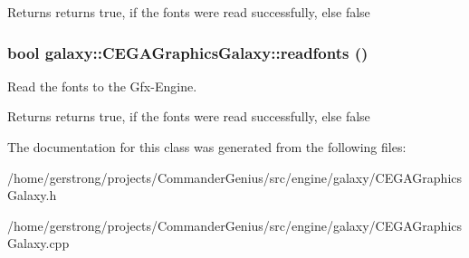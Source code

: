 \begin{DoxyReturn}{Returns}
returns true, if the fonts were read successfully, else false 
\end{DoxyReturn}
\hypertarget{classgalaxy_1_1_c_e_g_a_graphics_galaxy_a059bab49e5e4999f959a407084efe023}{
\subsubsection[{readfonts}]{\setlength{\rightskip}{0pt plus 5cm}bool galaxy::CEGAGraphicsGalaxy::readfonts ()}}
\label{classgalaxy_1_1_c_e_g_a_graphics_galaxy_a059bab49e5e4999f959a407084efe023}


Read the fonts to the Gfx-\/Engine. 

\begin{DoxyReturn}{Returns}
returns true, if the fonts were read successfully, else false 
\end{DoxyReturn}


The documentation for this class was generated from the following files:\begin{DoxyCompactItemize}
\item 
/home/gerstrong/projects/CommanderGenius/src/engine/galaxy/CEGAGraphicsGalaxy.h\item 
/home/gerstrong/projects/CommanderGenius/src/engine/galaxy/CEGAGraphicsGalaxy.cpp\end{DoxyCompactItemize}
